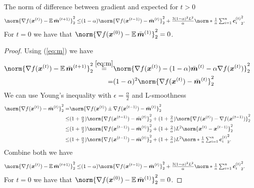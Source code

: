 \documentclass{article}
\begin{document}
\begin{lemma}\label{lemma:gem}
  The norm of difference between gradient and expected
  for $t>0$
  \begin{align*}
    \norm{\nabla f(\xx^{(t)}) - \E \bar{\mm}^{(t+1)} }_2^2
    \le &
    (1-\alpha) \norm{\nabla f(\xx^{(t-1)})- \bar{\mm}^{(t)}}_2^2
    + \tfrac{3(1-\alpha)^2L^2 }{\alpha}  \norm*{ \tfrac{1}{n} \tsum_{i=1}^n \cc_i^{(t)} }_2^2.
  \end{align*}
  For $t=0$ we have that $\norm{\nabla f(\xx^{(0)}) - \E \bar{\mm}^{(1)} }_2^2=0$.
\end{lemma}
\begin{proof}
  Using (\ref{eq:m}) we have
  \begin{align*}
    \norm{\nabla f(\xx^{(t)}) - \E \bar{\mm}^{(t+1)} }_2^2
    \stackrel{\eqref{eq:m}}{=} & \norm{\nabla f(\xx^{(t)}) - (1-\alpha)\bar{\mm}^{(t)} - \alpha \nabla f(\xx^{(t)}) }_2^2 \\
    =                          & (1-\alpha)^2  \norm{\nabla f(\xx^{(t)}) - \bar{\mm}^{(t)} }_2^2
  \end{align*}
  We can use Young's inequality with $\epsilon=\tfrac{\alpha}{2}$ and L-smoothness
  \begin{align*}
    \norm{\nabla f(\xx^{(t)})- \bar{\mm}^{(t)}}_2^2
    =   & \norm{\nabla f(\xx^{(t)}) \pm \nabla f(\xx^{(t-1)}) - \bar{\mm}^{(t)}}_2^2    \\
    \le & (1+\tfrac{\alpha}{2}) \norm{ \nabla f(\xx^{(t-1)}) - \bar{\mm}^{(t)}}_2^2
    + (1+\tfrac{2}{\alpha})      \norm{\nabla f(\xx^{(t)}) - \nabla f(\xx^{(t-1)})}_2^2 \\
    \le & (1+\tfrac{\alpha}{2}) \norm{ \nabla f(\xx^{(t-1)}) - \bar{\mm}^{(t)}}_2^2
    + (1+\tfrac{2}{\alpha}) L^2 \norm{\xx^{(t)} - \xx^{(t-1)}}_2^2                      \\
    \le & (1+\tfrac{\alpha}{2}) \norm{ \nabla f(\xx^{(t-1)}) - \bar{\mm}^{(t)}}_2^2
    + (1+\tfrac{2}{\alpha}) L^2  \norm*{ \tfrac{1}{n} \tsum_{i=1}^n \cc_i^{(t)} }_2^2.
  \end{align*}
  Combine both we have
  \begin{align*}
    \norm{\nabla f(\xx^{(t)}) - \E \bar{\mm}^{(t+1)} }_2^2
    \le &
    (1-\alpha) \norm{\nabla f(\xx^{(t-1)})- \bar{\mm}^{(t)}}_2^2
    + \tfrac{3(1-\alpha)^2L^2}{\alpha}  \norm*{ \tfrac{1}{n} \tsum_{i=1}^n \cc_i^{(t)} }_2^2.
  \end{align*}
  For $t=0$ we have that $\norm{\nabla f(\xx^{(0)}) - \E \bar{\mm}^{(1)} }_2^2=0$.
\end{proof}
\end{document}
